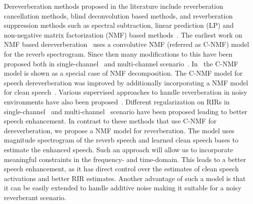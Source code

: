 Dereverberation methods proposed in the literature include reverberation cancellation methods, blind deconvolution based methods, and reverberation suppression methods such as spectral subtraction, linear prediction (LP) and non-negative matrix factorization (NMF) based methods~\cite{naylor2010speech}. The earliest work on NMF based dereverberation~\cite{kameoka2009robust} uses a convolutive NMF (referred as C-NMF) model for the reverb spectrogram. Since then many modifications to this have been proposed both in single-channel~\cite{Kumar2011,mohammadiha2016speech,Mohammadiha2015,baby2015coupled,Kallasjoki2014} and multi-channel scenario~\cite{Mirsamadi2014}. In~\cite{Kallasjoki2014}  the C-NMF model is shown as a special case of NMF decomposition. The C-NMF model for speech dereverberation was improved by additionally incorporating a NMF model for clean speech~\cite{mohammadiha2016speech, Mohammadiha2015}. Various supervised approaches to handle reverberation in noisy environments have also been proposed~\cite{baby2015coupled, baby2016phd, baby2017joint}.  
Different regularization on RIRs in single-channel~\cite{baby2017joint,mohanan2017speech} and multi-channel~\cite{Yu2014} scenario have been proposed leading to better speech enhancement. In contrast to these methods that use C-NMF for dereverberation, we propose a NMF model for reverberation. The model uses magnitude spectrogram of the reverb speech and learned clean speech bases to estimate the enhanced speech. Such an approach will allow us to incorporate meaningful constraints in the frequency- and time-domain. This leads to a better speech enhancement, as it has direct control over the estimates of clean speech activations and better RIR estimates. Another advantage of such a model is that it can be easily extended to handle additive noise making it suitable for a noisy reverberant scenario. 
